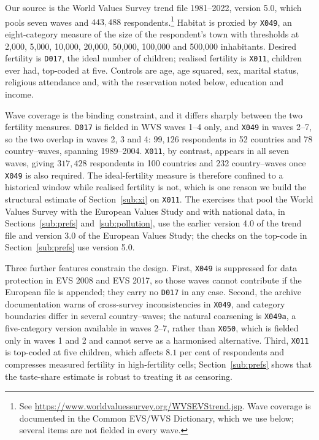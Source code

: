 \documentclass[11pt]{article}
\begin{document}
Our source is the World Values Survey trend file 1981--2022, version 5.0, which pools seven waves and
$443{,}488$ respondents.\footnote{See \url{https://www.worldvaluessurvey.org/WVSEVStrend.jsp}.
Wave coverage is documented in the Common EVS/WVS Dictionary, which we use below; several items
are not fielded in every wave.} Habitat is proxied by \texttt{X049}, an eight-category measure of
the size of the respondent's town with thresholds at 2{,}000, 5{,}000, 10{,}000, 20{,}000,
50{,}000, 100{,}000 and 500{,}000 inhabitants. Desired fertility is \texttt{D017}, the ideal number
of children; realised fertility is \texttt{X011}, children ever had, top-coded at five. Controls
are age, age squared, sex, marital status, religious attendance and, with the reservation noted below, education
and income.

Wave coverage is the binding constraint, and it differs sharply between the two fertility measures.
\texttt{D017} is fielded in WVS waves 1--4 only, and \texttt{X049} in waves 2--7, so the two
overlap in waves 2, 3 and 4: $99{,}126$ respondents in 52 countries and 78 country--waves, spanning
1989--2004. \texttt{X011}, by contrast, appears in all seven waves, giving $317{,}428$ respondents
in 100 countries and 232 country--waves once \texttt{X049} is also required. The ideal-fertility
measure is therefore confined to a historical window while realised fertility is not, which is one
reason we build the structural estimate of Section~\ref{sub:xi} on \texttt{X011}. The exercises that
pool the World Values Survey with the European Values Study and with national data, in
Sections~\ref{sub:prefs} and~\ref{sub:pollution}, use the earlier version 4.0 of the trend file and
version 3.0 of the European Values Study; the checks on the top-code in Section~\ref{sub:prefs} use
version 5.0.

Three further features constrain the design. First, \texttt{X049} is suppressed for data protection
in EVS 2008 and EVS 2017, so those waves cannot contribute if the European file is appended; they
carry no \texttt{D017} in any case. Second, the archive documentation warns of cross-survey
inconsistencies in \texttt{X049}, and category boundaries differ in several country--waves; the
natural coarsening is \texttt{X049a}, a five-category version available in waves 2--7, rather than
\texttt{X050}, which is fielded only in waves 1 and 2 and cannot serve as a harmonised alternative.
Third, \texttt{X011} is top-coded at five children, which affects $8.1$ per cent of respondents and
compresses measured fertility in high-fertility cells; Section~\ref{sub:prefs} shows that the
taste-share estimate is robust to treating it as censoring.
\end{document}
